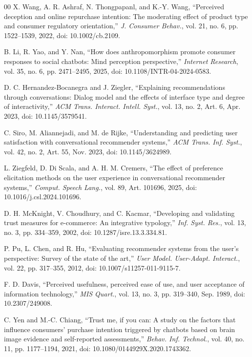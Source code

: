 \documentclass[conference]{IEEEtran}
\begin{document}
\begin{thebibliography}{00}
X. Wang, A. R. Ashraf, N. Thongpapanl, and K.-Y. Wang, ``Perceived deception and
online repurchase intention: The moderating effect of product type and consumer
regulatory orientation,'' \textit{J. Consumer Behav.}, vol. 21, no. 6,
pp. 1522--1539, 2022, doi: 10.1002/cb.2109.

B. Li, R. Yao, and Y. Nan, ``How does anthropomorphism promote consumer responses to
social chatbots: Mind perception perspective,'' \textit{Internet Research},
vol. 35, no. 6, pp. 2471--2495, 2025, doi: 10.1108/INTR-04-2024-0583.

D. C. Hernandez-Bocanegra and J. Ziegler, ``Explaining recommendations through
conversations: Dialog model and the effects of interface type and degree of
interactivity,'' \textit{ACM Trans. Interact. Intell. Syst.}, vol. 13, no. 2,
Art. 6, Apr. 2023, doi: 10.1145/3579541.

C. Siro, M. Aliannejadi, and M. de Rijke, ``Understanding and predicting user
satisfaction with conversational recommender systems,'' \textit{ACM Trans. Inf.
Syst.}, vol. 42, no. 2, Art. 55, Nov. 2023, doi: 10.1145/3624989.

L. Ziegfeld, D. Di Scala, and A. H. M. Cremers, ``The effect of preference
elicitation methods on the user experience in conversational recommender systems,''
\textit{Comput. Speech Lang.}, vol. 89, Art. 101696, 2025,
doi: 10.1016/j.csl.2024.101696.

D. H. McKnight, V. Choudhury, and C. Kacmar, ``Developing and validating trust
measures for e-commerce: An integrative typology,'' \textit{Inf. Syst. Res.},
vol. 13, no. 3, pp. 334--359, 2002, doi: 10.1287/isre.13.3.334.81.

P. Pu, L. Chen, and R. Hu, ``Evaluating recommender systems from the user's
perspective: Survey of the state of the art,'' \textit{User Model. User-Adapt.
Interact.}, vol. 22, pp. 317--355, 2012, doi: 10.1007/s11257-011-9115-7.

F. D. Davis, ``Perceived usefulness, perceived ease of use, and user acceptance of
information technology,'' \textit{MIS Quart.}, vol. 13, no. 3, pp. 319--340, Sep. 1989,
doi: 10.2307/249008.

C. Yen and M.-C. Chiang, ``Trust me, if you can: A study on the factors that
influence consumers' purchase intention triggered by chatbots based on brain image
evidence and self-reported assessments,'' \textit{Behav. Inf. Technol.}, vol. 40,
no. 11, pp. 1177--1194, 2021, doi: 10.1080/0144929X.2020.1743362.


\end{thebibliography}
\end{document}
